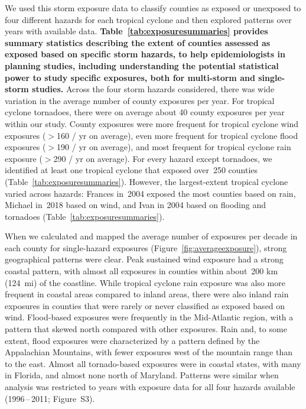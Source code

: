 We used this storm exposure data to classify counties as exposed or unexposed
to four different hazards for each tropical cyclone and then explored patterns
over years with available data. \textbf{Table~\ref{tab:exposuresummaries}
provides summary statistics describing the extent of counties assessed as
exposed based on specific storm hazards, to help epidemiologists in planning
studies, including understanding the potential statistical power to study
specific exposures, both for multi-storm and single-storm studies.} Across the
four storm hazards considered, there was wide variation in the average number
of county exposures per year. For tropical cyclone tornadoes, there were on
average about 40 county exposures per year within our study.  County exposures
were more frequent for tropical cyclone wind exposures ($>$160 / yr on
average), even more frequent for tropical cyclone flood exposures ($>$190 / yr
on average), and most frequent for tropical cyclone rain exposure ($>$290 / yr
on average). For every hazard except tornadoes, we identified at least one
tropical cyclone that exposed over~250 counties
(Table~\ref{tab:exposuresummaries}).  However, the largest-extent tropical
cyclone varied across hazards: Frances in~2004 exposed the most counties based
on rain, Michael in~2018 based on wind, and Ivan in 2004 based on flooding and
tornadoes (Table~\ref{tab:exposuresummaries}).

When we calculated and mapped the average number of exposures per decade in
each county for single-hazard exposures (Figure~\ref{fig:averageexposure}),
strong geographical patterns were clear. Peak sustained wind exposure had a
strong coastal pattern, with almost all exposures in counties within about~200
\si{\kilo\metre} (124~mi) of the coastline. While tropical cyclone rain
exposure was also more frequent in coastal areas compared to inland areas,
there were also inland rain exposures in counties that were rarely or never
classified as exposed based on wind. Flood-based exposures were frequently in
the Mid-Atlantic region, with a pattern that skewed north compared with other
exposures. Rain and, to some extent, flood exposures were characterized by a
pattern defined by the Appalachian Mountains, with fewer exposures west of the
mountain range than to the east. Almost all tornado-based exposures were in
coastal states, with many in Florida, and almost none north of Maryland.
Patterns were similar when analysis was restricted to years with exposure data
for all four hazards available (1996\,--\,2011; Figure~S3). 


